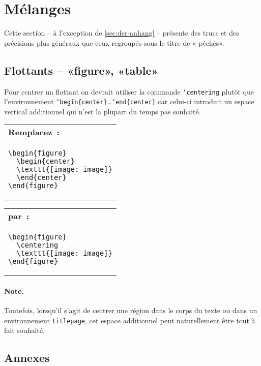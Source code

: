 \documentclass[fontsize=11pt, paper=a4, pagesize, captions=tableheading, numbers=enddot, toc=graduated, footnotes=multiple]{scrartcl}%
\makeatletter
\DeclareRobustCommand*{\Macro}[1]{\mbox{\texttt{\char`\\#1}}}
\DeclareRobustCommand*{\LMacro}[2]{\mbox{\texttt{\char`\\#1\{#2\}}}}
\newenvironment{Ers}[1][\linewidth]{%
  \par\bigskip\noindent\marginline{\textcolor{gruen}{\boldmath $\triangleright$}}\begin{tabular}[t]{@{}p{0.5\textwidth}@{}}\textcolor{rot}{\textbf{\textsf{Remplacez~:}}%
}\\[2pt] \rahmenpr[#1]}%
{\endrahmenpr\end{tabular}}
\newenvironment{Dur}[1][0.5\textwidth]{%
\noindent\begin{tabular}[t]{@{}p{0.5\textwidth - 0.5em}@{}}\textcolor{gruen}{\textbf{\textsf{par~:}}}\\[2pt]\rahmenpg[#1]}%
{\endrahmenpg\end{tabular}\smallskip\noindent}
\makeatother
\begin{document}
\section{Mélanges}
\label{sec:verschiedenes}

Cette section – à l’exception de \vref{sec:der-anhang} – présente des trucs et des précisions plus généraux que ceux regroupés sous le titre de « péchés».

\subsection{Flottants – «figure», «table»}
\label{sec:gleit-figure-table}

Pour centrer un flottant on devrait utiliser la commande \Macro{centering} plutôt que l'environnement \LMacro{begin}{center}…\LMacro{end}{center} car celui-ci introduit un espace vertical additionnel qui n’est la plupart du temps pas souhaité.

\begin{Ers}
\begin{verbatim}
\begin{figure}
  \begin{center}
  \texttt{[image: image]}
  \end{center}
\end{figure}
\end{verbatim}
\end{Ers}
\begin{Dur}
\begin{verbatim}
\begin{figure}
  \centering
  \texttt{[image: image]}
\end{figure}
\end{verbatim}
\end{Dur}

\paragraph{Note.}
\label{sec:anmerkung-4}

Toutefois, lorsqu'il s'agit de centrer une région dans le corps du texte ou dans un environnement \verb+titlepage+, cet espace additionnel peut naturellement être tout à fait souhaité.

\subsection{Annexes}
\label{sec:der-anhang}
\end{document}
